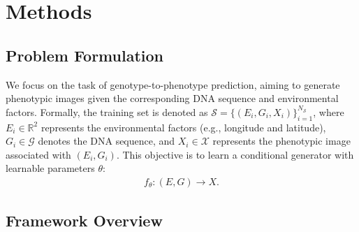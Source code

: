 \section{Methods}
\label{sec:Preliminary}

\subsection{Problem Formulation}

We focus on the task of genotype-to-phenotype prediction, aiming to generate phenotypic images given the corresponding DNA sequence and environmental factors. Formally, the training set is denoted as $\mathcal{S} = \{(E_i, G_i, X_i)\}_{i=1}^{N_\mathcal{S}}$, where $E_i \in \mathbb{R}^2$ represents the environmental factors (e.g., longitude and latitude), $G_i \in \mathcal{G}$ denotes the DNA sequence, and $X_i \in \mathcal{X}$ represents the phenotypic image associated with $(E_i, G_i)$.
This objective is to learn a conditional generator with learnable parameters $\theta$:
\begin{align}
\label{eq:forward_ddpm2}
    f_{\theta}: (E, G) \rightarrow X.
\end{align}


\subsection{Framework Overview}
\label{sec:Framework Overview}


